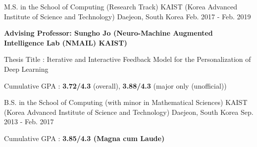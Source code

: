 

\begin{cventries}

  \cventry
    {M.S. in the School of Computing (Research Track)} %
    {KAIST (Korea Advanced Institute of Science and Technology)} %
    {Daejeon, South Korea} %
    {Feb. 2017 - Feb. 2019} %
    {
      \begin{cvitems} %
        \item {\textbf{Advising Professor: Sungho Jo (Neuro-Machine Augmented Intelligence Lab (NMAIL) KAIST)}}
        \item {Thesis Title : Iterative and Interactive Feedback Model for the Personalization of Deep Learning}
        \item {Cumulative GPA : \textbf{3.72/4.3} (overall), \textbf{3.88/4.3} (major only (unofficial))}
      \end{cvitems}
    }
    {}

  \cventry
    {B.S. in the School of Computing (with minor in Mathematical Sciences)} %
    {KAIST (Korea Advanced Institute of Science and Technology)} %
    {Daejeon, South Korea} %
    {Sep. 2013 - Feb. 2017} %
    {
      \begin{cvitems} %
        \item {Cumulative GPA : \textbf{3.85/4.3 (Magna cum Laude)}}
      \end{cvitems}
    }
    {}

\end{cventries}
